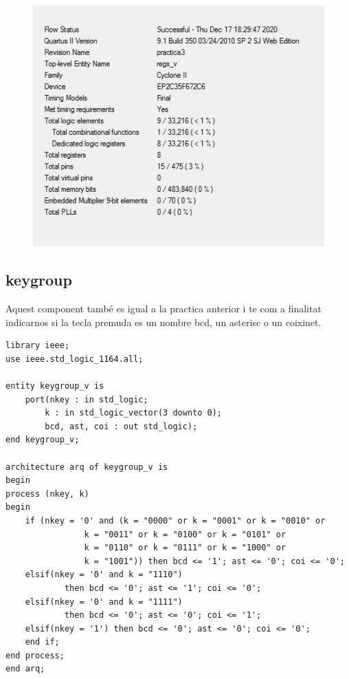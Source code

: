 \documentclass[12pt, a4papre]{article}
\begin{document}
			\begin{figure}[H]
		\begin{center}
		\includegraphics[width=130mm]{informeRegs.jpeg}
		\end{center}
	\end{figure}	


\subsection{keygroup}

	Aquest component també es igual a la practica anterior i te com a finalitat indicarnos si la tecla premuda es un nombre bcd, un asterisc o un coixinet.
	
		\begin{lstlisting}[style=vhdl, frame=single, basicstyle=\tiny]
	library ieee;
use ieee.std_logic_1164.all;

entity keygroup_v is
	port(nkey : in std_logic;
		k : in std_logic_vector(3 downto 0);
		bcd, ast, coi : out std_logic);
end keygroup_v;

architecture arq of keygroup_v is
begin
process (nkey, k)
begin
	if (nkey = '0' and (k = "0000" or k = "0001" or k = "0010" or
				k = "0011" or k = "0100" or k = "0101" or
				k = "0110" or k = "0111" or k = "1000" or
				k = "1001")) then bcd <= '1'; ast <= '0'; coi <= '0';
	elsif(nkey = '0' and k = "1110")
			then bcd <= '0'; ast <= '1'; coi <= '0';
	elsif(nkey = '0' and k = "1111")
			then bcd <= '0'; ast <= '0'; coi <= '1';
	elsif(nkey = '1') then bcd <= '0'; ast <= '0'; coi <= '0';
	end if;
end process;
end arq;
		\end{lstlisting}
		
\end{document}
